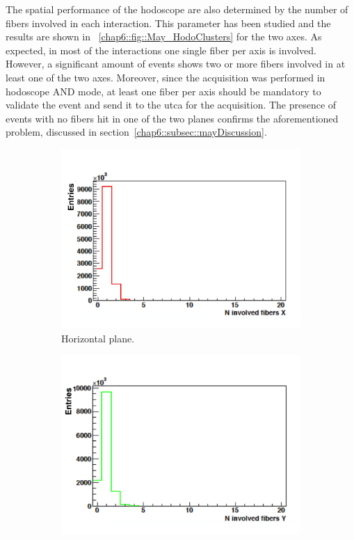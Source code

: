The spatial performance of the hodoscope are also determined by the number of fibers involved in each interaction. This parameter has been studied and the results are shown in \figurename~\ref{chap6::fig::May_HodoClusters} for the two axes. As expected, in most of the interactions one single fiber per axis is involved. However, a significant amount of events shows two or more fibers involved in at least one of the two axes. Moreover, since the acquisition was performed in hodoscope AND mode, at least one fiber per axis should be mandatory to validate the event and send it to the \gls{utca} for the acquisition. The presence of events with no fibers hit in one of the two planes confirms the aforementioned problem, discussed in section~\ref{chap6::subsec::mayDiscussion}. 
 
\begin{figure}
\begin{subfigure}[t]{.5\textwidth}
\centering
\includegraphics[width=1.\textwidth]{03_GraphicFiles/chapter6_BeamTests/Nice_May2018/clusterX.png}
\caption{Horizontal plane.}
\label{chap6::fig::May_HodoClusX}
\end{subfigure}
\begin{subfigure}[t]{.5\textwidth}
\centering
\includegraphics[width=1.\textwidth]{03_GraphicFiles/chapter6_BeamTests/Nice_May2018/clusterY.png}	

\end{subfigure}
\end{figure}
